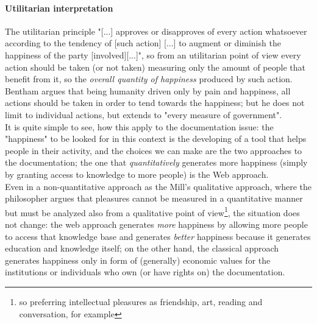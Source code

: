 \documentclass{article}
\begin{document}
			\paragraph{Utilitarian interpretation}
				The utilitarian principle "[...] approves or disapproves of every action whatsoever according to the tendency of [such action] [...] to augment or diminish the happiness of the party [involved][...]"\cite{utilityprinciple}, so from an utilitarian point of view every action should be taken (or not taken) measuring only the amount of people that benefit from it, so the \textit{overall quantity of happiness} produced by such action. Bentham argues that being humanity driven only by pain and happiness, all actions should be taken in order to tend towards the happiness; but he does not limit to individual actions, but extends to "every measure of government"\cite{utilityprinciple}.\\
				It is quite simple to see, how this apply to the documentation issue: the "happiness" to be looked for in this context is the developing of a tool that helps people in their activity, and the choices we can make are the two approaches to the documentation; the one that \textit{quantitatively} generates more happiness (simply by granting access to knowledge to more people) is the Web approach.\\
				Even in a non-quantitative approach as the Mill's qualitative approach\cite{millutilitarianism}, where the philosopher argues that pleasures cannot be measured in a quantitative manner but must be analyzed also from a qualitative point of view\footnote{so preferring intellectual pleasures as friendship, art, reading and conversation, for example}, the situation does not change: the web approach generates \textit{more} happiness by allowing more people to access that knowledge base and generates \textit{better} happiness because it generates education and knowledge itself; on the other hand, the classical approach generates happiness only in form of (generally) economic values for the institutions or individuals who own (or have rights on) the documentation. 
\end{document}
